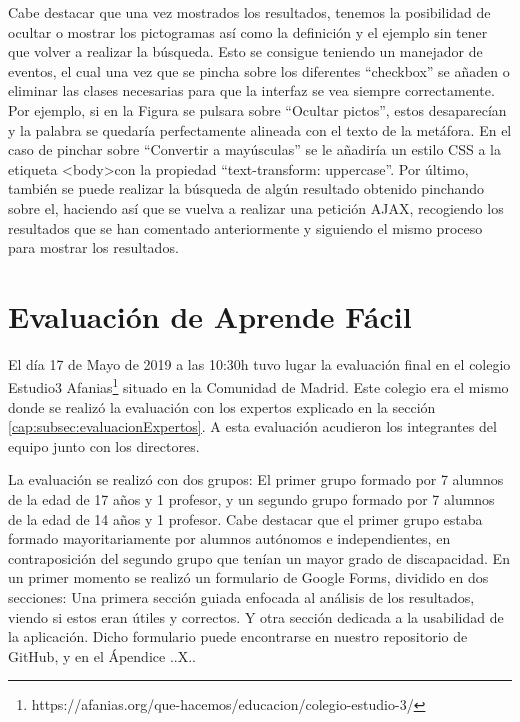 Cabe destacar que una vez mostrados los resultados, tenemos la posibilidad de ocultar o mostrar los pictogramas así como la definición y el ejemplo sin tener que volver a realizar la búsqueda. Esto se consigue teniendo un manejador de eventos, el cual una vez que se pincha sobre los diferentes ``checkbox'' se añaden o eliminar las clases necesarias para que la interfaz se vea siempre correctamente. Por ejemplo, si en la Figura se pulsara sobre ``Ocultar pictos'', estos desaparecían y la palabra se quedaría perfectamente alineada con el texto de la metáfora. En el caso de pinchar sobre ``Convertir a mayúsculas'' se le añadiría un estilo CSS a la etiqueta <body>con la propiedad ``text-transform: uppercase''.
Por último, también se puede realizar la búsqueda de algún resultado obtenido pinchando sobre el, haciendo así que se vuelva a realizar una petición AJAX, recogiendo los resultados que se han comentado anteriormente y siguiendo el mismo proceso para mostrar los resultados.

\section{Evaluación de Aprende Fácil}

El día 17 de Mayo de 2019 a las 10:30h tuvo lugar la evaluación final en el colegio Estudio3 Afanias\footnote{https://afanias.org/que-hacemos/educacion/colegio-estudio-3/} situado en la Comunidad de Madrid. Este colegio era el mismo donde se realizó la evaluación con los expertos explicado en la sección \ref{cap:subsec:evaluacionExpertos}. A esta evaluación acudieron los integrantes del equipo junto con los directores.

La evaluación se realizó con dos grupos: El primer grupo formado por 7 alumnos de la edad de 17 años y 1 profesor, y un segundo grupo formado por 7 alumnos de la edad de 14 años y 1 profesor.
Cabe destacar que el primer grupo estaba formado mayoritariamente por alumnos autónomos e independientes, en contraposición del segundo grupo que tenían un mayor grado de discapacidad.
En un primer momento se realizó un formulario de Google Forms, dividido en dos secciones: Una primera sección guiada enfocada al análisis de los resultados, viendo si estos eran útiles y correctos.  Y otra sección dedicada a la usabilidad de la aplicación.
Dicho formulario  puede encontrarse en nuestro repositorio de GitHub, y en el Ápendice ..X..


